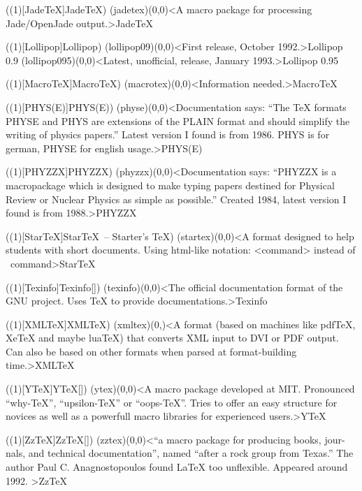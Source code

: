 \tograph(\tostruct(1)[Jade\TeX]{Jade\TeX}){
	\tonode(jadetex)(0,0)<A macro package for processing Jade/OpenJade output.>{Jade\TeX}
}

\tograph(\tostruct(1)[Lollipop]{Lollipop}){
	\tonode(lollipop09)(0,0)<First release, October 1992.>{Lollipop 0.9}
	\steplayer
	\tonode(lollipop095)(0,0)<Latest, unofficial, release, January 1993.>{Lollipop 0.95}
}

\tograph(\tostruct(1)[Macro\TeX]{Macro\TeX}){
	\tonode(macrotex)(0,0)<Information needed.>{Macro\TeX}
}

\tograph(\tostruct(1)[PHYS(E)]{PHYS(E)}){
	\tonode(physe)(0,0)<Documentation says: “The TeX formats PHYSE and PHYS are extensions of the PLAIN format
and should simplify the writing of physics papers.” Latest version I found is from 1986. PHYS is for german, PHYSE for english usage.>{PHYS(E)}
}

\tograph(\tostruct(1)[PHYZZX]{PHYZZX}){
	\tonode(phyzzx)(0,0)<Documentation says: “PHYZZX is a macropackage which is designed to make typing papers destined for Physical Review or Nuclear Physics as simple as possible.” Created 1984, latest version I found is from 1988.>{PHYZZX}
}

\tograph(\tostruct(1)[Star\TeX]{Star\TeX\ – Starter's \TeX}){
	\tonode(startex)(0,0)<A format designed to help students with short documents. Using html-like notation: <command> instead of \ command>{Star\TeX}
}

\tograph(\tostruct(1)[Texinfo]{Texinfo}[\normalimportant]){
	\tonode(texinfo)(0,0)<The official documentation format of the GNU project. Uses TeX to provide documentations.>{Texinfo}
}

\tograph(\tostruct(1)[XML\TeX]{XML\TeX}){
  \tonode(xmltex)(0,\layer)<A format (based on machines like pdfTeX, XeTeX and maybe luaTeX) that converts XML input to DVI or PDF output. Can also be based on other formats when parsed at format-building time.>{XML\TeX}
}

\tograph(\tostruct(1)[Y\TeX]{Y\TeX}[\experimental]){
	\tonode(ytex)(0,0)<A macro package developed at MIT. Pronounced “why-TeX”, “upsilon-TeX” or “oops-TeX”. Tries to offer an easy structure for novices as well as a powerfull macro libraries for experienced users.>{Y\TeX}
}

\tograph(\tostruct(1)[Zz\TeX]{Zz\TeX}[\normalimportant]){
	\tonode(zztex)(0,0)<“a macro package for producing books, jour-
nals, and technical documentation”, named “after a rock group from Texas.” The author Paul C. Anagnostopoulos found LaTeX too unflexible. Appeared around 1992.
>{Zz\TeX}
}

